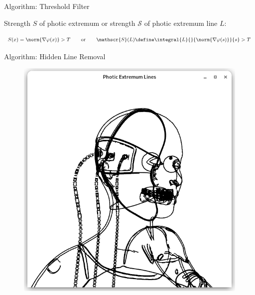 \documentclass[aspectratio=169]{beamer}
\begin{document}
\begin{frame}{Algorithm: Threshold Filter}
\begin{figure}
    \end{figure}
    \pause
    Strength $S$ of photic extremum or strength $\mathscr{S}$ of photic extremum line $L$:
    \begin{mybox}
      \[
        S(x) = \norm{\nabla \varphi(x)} > T
        \qquad \text{or} \qquad
        \mathscr{S}(L) \define \integral{L}{}{\norm{\nabla \varphi(s)}}{s} > T
      \]
    \end{mybox}
  \end{frame}

  \begin{frame}{Algorithm: Hidden Line Removal}
    \begin{figure}
      \center
      \includegraphics[height=0.49\textheight,trim={15px 15 15 50},clip]{images/cyborg-contour-pel-hidden-shader.png}
      \hspace{5em}

\end{figure}
\end{frame}
\end{document}
